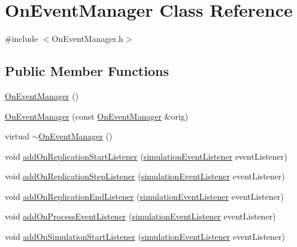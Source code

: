 \hypertarget{class_on_event_manager}{\section{On\-Event\-Manager Class Reference}
\label{class_on_event_manager}
}


{\ttfamily \#include $<$On\-Event\-Manager.\-h$>$}

\subsection*{Public Member Functions}
\begin{DoxyCompactItemize}
\item 
\hyperlink{class_on_event_manager_a15f856c9d10d1c8fc002a7ec6f51bae9}{On\-Event\-Manager} ()
\item 
\hyperlink{class_on_event_manager_ae83cecca7e8a1f7d4e921cfa201c7fff}{On\-Event\-Manager} (const \hyperlink{class_on_event_manager}{On\-Event\-Manager} \&orig)
\item 
virtual \hyperlink{class_on_event_manager_aab0f5d9e7698be7860decf65e487de42}{$\sim$\-On\-Event\-Manager} ()
\item 
void \hyperlink{class_on_event_manager_a7c8270fc85b56ef80bbba29c1e2f4a22}{add\-On\-Replication\-Start\-Listener} (\hyperlink{_on_event_manager_8h_aff2bc2c2877d3e4e7c13ea94d46b57e3}{simulation\-Event\-Listener} event\-Listener)
\item 
void \hyperlink{class_on_event_manager_ad42eb83d9a6614ae13bd49943bc68e7e}{add\-On\-Replication\-Step\-Listener} (\hyperlink{_on_event_manager_8h_aff2bc2c2877d3e4e7c13ea94d46b57e3}{simulation\-Event\-Listener} event\-Listener)
\item 
void \hyperlink{class_on_event_manager_af4d92bf77d1811fa3168ed2fbb1ce99c}{add\-On\-Replication\-End\-Listener} (\hyperlink{_on_event_manager_8h_aff2bc2c2877d3e4e7c13ea94d46b57e3}{simulation\-Event\-Listener} event\-Listener)
\item 
void \hyperlink{class_on_event_manager_aa5fa457960768e89460936cd3013daec}{add\-On\-Process\-Event\-Listener} (\hyperlink{_on_event_manager_8h_aff2bc2c2877d3e4e7c13ea94d46b57e3}{simulation\-Event\-Listener} event\-Listener)
\item 
void \hyperlink{class_on_event_manager_a4341d723dabd237c98fe5a4fdc435b29}{add\-On\-Simulation\-Start\-Listener} (\hyperlink{_on_event_manager_8h_aff2bc2c2877d3e4e7c13ea94d46b57e3}{simulation\-Event\-Listener} event\-Listener)
\item 

\end{DoxyCompactItemize}
